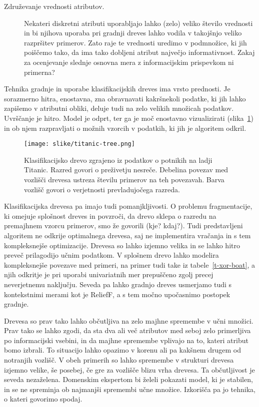 \begin{description}
\item[Združevanje vrednosti atributov.] Nekateri diskretni atributi uporabljajo lahko (zelo) veliko število vrednosti in bi njihova uporaba pri gradnji dreves lahko vodila v takojšnjo veliko razpršitev primerov. Zato raje te vrednosti uredimo v podmnožice, ki jih poiščemo tako, da ima tako dobljeni atribut največjo informativnost. Zakaj za ocenjevanje slednje osnovna mera z informacijskim prispevkom ni primerna?
\end{description}

Tehnika gradnje in uporabe klasifikacijskih dreves ima vrsto prednosti. Je sorazmerno hitra, enostavna, zna obravnavati kakršnekoli podatke, ki jih lahko zapišemo v atributni obliki, deluje tudi na zelo velikih množicah podatkov. Uvrščanje je hitro. Model je odprt, ter ga je moč enostavno vizualizirati (slika~\ref{f-titanic-tree}) in ob njem razpravljati o možnih vzorcih v podatkih, ki jih je algoritem odkril.

\begin{figure}[htbp]
\begin{center}
\texttt{[image: slike/titanic-tree.png]}
\caption{Klasifikacijsko drevo zgrajeno iz podatkov o potnikih na ladji Titanic. Razred govori o preživetju nesreče. Debelina povezav med vozlišči drevesa ustreza številu primerov na teh povezavah. Barva vozlišč govori o verjetnosti prevladujočega razreda.}
\label{f-titanic-tree}
\end{center}
\end{figure}

Klasifikacijska drevesa pa imajo tudi pomanjkljivosti. O problemu fragmentacije, ki omejuje splošnost dreves in povzroči, da drevo sklepa o razredu na premajhnem vzorcu primerov, smo že govorili (kje? kdaj?). Tudi predstavljeni algoritem ne odkrije optimalnega drevesa, saj ne implementira vračanja in s tem kompleksnejše optimizacije. Drevesa so lahko izjemno velika in se lahko hitro preveč prilagodijo učnim podatkom. V splošnem drevo lahko modelira kompleksnejše povezave med primeri, na primer tudi take iz tabele~\ref{t-xor-boat}, a njih odkritje je pri uporabi univariatnih mer prepuščeno zgolj precej neverjetnemu naključju. Seveda pa lahko gradnjo dreves usmerjamo tudi s kontekstnimi merami kot je ReliefF, a s tem močno upočasnimo postopek gradnje.

Drevesa so prav tako lahko občutljiva na zelo majhne spremembe v učni množici. Prav tako se lahko zgodi, da sta dva ali več atributov med seboj zelo primerljiva po informacijski vsebini, in da majhne spremembe vplivajo na to, kateri atribut bomo izbrali. To situacijo lahko opazimo v korenu ali pa kakšnem drugem od notranjih vozlišč. V obeh primerih so lahko spremembe v strukturi drevesa izjemno velike, še posebej, če gre za vozlišče blizu vrha drevesa. Ta občutljivost je seveda nezaželena. Domenskim ekspertom bi želeli pokazati model, ki je stabilen, in se ne spreminja ob najmanjši spremembi učne množice. Izkorišča pa jo tehnika, o kateri govorimo spodaj.

